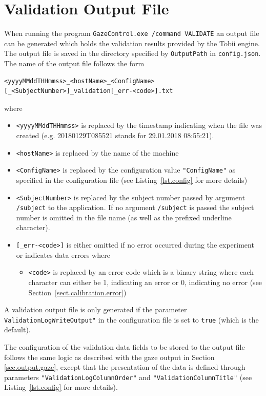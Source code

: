 \documentclass[a4paper,oneside]{book}
\begin{document}
\section{Validation Output File}
When running the program \texttt{GazeControl.exe /command VALIDATE} an output file can be generated which holds the validation results provided by the Tobii engine.
The output file is saved in the directory specified by \texttt{OutputPath} in \texttt{config.json}.
The name of the output file follows the form
\begin{lstlisting}
<yyyyMMddTHHmmss>_<hostName>_<ConfigName>[_<SubjectNumber>]_validation[_err-<code>].txt
\end{lstlisting}
where
\begin{itemize}
    \item \texttt{<yyyyMMddTHHmmss>} is replaced by the timestamp indicating when the file was created (e.g. 20180129T085521 stands for 29.01.2018 08:55:21).
    \item \texttt{<hostName>} is replaced by the name of the machine
    \item \texttt{<ConfigName>} is replaced by the configuration value \texttt{"ConfigName"} as specified in the configuration file (see Listing~\ref{lst.config} for more details)
    \item \texttt{<SubjectNumber>} is replaced by the subject number passed by argument \texttt{/subject} to the application.
        If no argument \texttt{/subject} is passed the subject number is omitted in the file name (as well as the prefixed underline character).
    \item \texttt{[\_err-<code>]} is either omitted if no error occurred during the experiment or indicates data errors where
        \begin{itemize}
            \item \texttt{<code>} is replaced by an error code which is a binary string where each character can either be 1, indicating an error or 0, indicating no error (see Section~\ref{sect.calibration.error})
        \end{itemize}
\end{itemize}

A validation output file is only generated if the parameter \texttt{ValidationLogWriteOutput"} in the configuration file is set to \texttt{true} (which is the default).

The configuration of the validation data fields to be stored to the output file follows the same logic as described with the gaze output in Section \ref{sec.output.gaze}, except that the presentation of the data is defined through parameters \texttt{"ValidationLogColumnOrder"} and \texttt{"ValidationColumnTitle"} (see Listing~\ref{lst.config} for more details).
\end{document}
